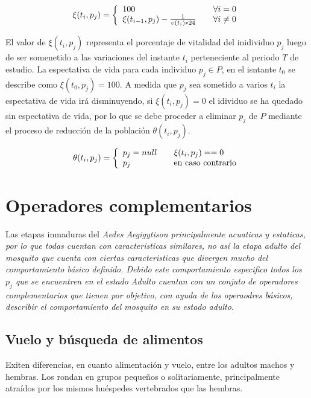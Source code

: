 \begin{equation}
\xi (t_{i}, p_{j}) = \left\{
  \begin{array}{l l}
    100 & \quad \forall i = 0 \\
    \xi (t_{i-1}, p_{j}) - \frac{1}{\upsilon(t_{i}) * 24} & \quad \forall i \neq 0
  \end{array} \right.
\end{equation}

El valor de $\xi (t_{i}, p_{j})$ representa el porcentaje de vitalidad del
inidividuo $p_{j}$ luego de ser somenetido a las variaciones del instante
$t_{i}$ perteneciente al periodo $T$ de estudio. La espectativa de vida
para cada individuo $p_{j} \in P$, en el isntante $t_{0}$ se describe como
$\xi (t_{0}, p_{j})= 100$. A medida que $p_{j}$ sea sometido a varios
$t_{i}$ la espectativa de vida irá disminuyendo, si $\xi (t_{i}, p_{j})= 0$ el
idividuo se ha quedado sin espectativa de vida, por lo que se debe proceder
a eliminar $p_{j}$ de $P$ mediante el proceso de reducción de la población
$\theta (t_{i}, p_{j})$.

\begin{equation}
\theta (t_{i}, p_{j}) = \left\{
  \begin{array}{l l}
    p_{j} = null & \quad \xi(t_{i}, p_{j}) == 0 \\
    p_{j} & \quad \text{en caso contrario}
  \end{array} \right.
\end{equation}

\section{Operadores complementarios}
Las etapas inmaduras del \em Aedes Aegigyti\em son principalmente acuaticas
y estaticas, por lo que todas cuentan con caracteristicas similares, no
así la etapa adulto del mosquito que cuenta con ciertas caracteristicas
que divergen mucho del comportamiento básico definido. Debido este
comportamiento especifico todos los $p_{j}$ que se encuentren en el estado
\em Adulto \em cuentan con un conjuto de operadores complementarios que
tienen por objetivo, con ayuda de los operaodres básicos, describir el
comportamiento del mosquito en su estado adulto.

\subsection{Vuelo y búsqueda de alimentos}
Exiten diferencias, en cuanto alimentación y vuelo, entre los adultos
machos y hembras. Los rondan en grupos pequeños o solitariamente,
principalmente atraídos por los mismos huéspedes vertebrados que las hembras.

